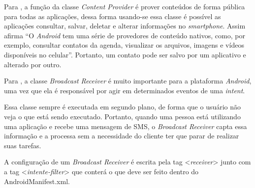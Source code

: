 	\par Para , a função da classe \textit{Content
Provider} é prover conteúdos de forma pública para todas as aplicações, dessa
forma usando-se essa classe é possível as aplicações consultar, salvar, deletar
e alterar informações no \textit{smartphone}. Assim afirma
 “O \textit{Android} tem uma série de provedores
de conteúdo nativos, como, por exemplo, consultar contatos da agenda,
visualizar os arquivos, imagens e vídeos disponíveis no celular”. Portanto, um
contato pode ser salvo por um aplicativo e alterado por outro.

	\par Para , a classe \textit{Broadcast Receiver}
é muito importante para a plataforma \textit{Android}, uma vez que ela é
responsável por agir em determinados eventos de uma \textit{intent}.

	\par Essa classe sempre é executada em segundo plano, de forma que o usuário
não veja o que está sendo executado. Portanto, quando uma pessoa está
utilizando uma aplicação e recebe uma mensagem de SMS, o \textit{Broadcast
Receiver} capta essa informação e a processa sem a necessidade do cliente ter
que parar de realizar suas tarefas.

	\par A configuração de um \textit{Broadcast Receiver} é escrita pela tag
<\textit{receiver}> junto com a tag <\textit{intente-filter}> que conterá o que
deve ser feito dentro do AndroidManifest.xml.

